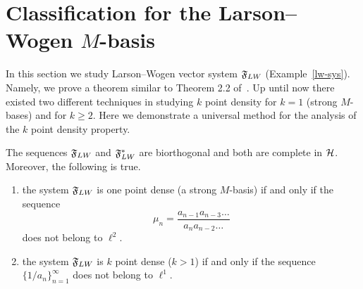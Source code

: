 \section{Classification for the Larson--Wogen $M$-basis}
  \label{section:lw-sys}
  In this section we study Larson--Wogen vector system $\fsys_{LW}$ (Example~\ref{lw-sys}).
  Namely, we prove a theorem similar to Theorem 2.2 of~\cite{katavolos}.
  Up until now there existed two different techniques in studying $k$ point density for $k=1$ (strong $M$-bases) and for $k\geq2$.
  Here we demonstrate a universal method for the analysis of the $k$ point density property.
  \begin{theorem}
    \label{thm:katavolos}
    The sequences $\fsys_{LW}$ and $\fsys_{LW}^*$ are biorthogonal and both are complete in $\cal{H}$.
    Moreover, the following is true.
    \begin{enumerate}
      \item  the system $\fsys_{LW}$ is one point dense (a strong $M$-basis) if and only if the sequence
        \begin{equation}
          \mu_n = \frac{a_{n-1} a_{n-3} \dots}{a_{n} a_{n-2} \dots }
        \end{equation}
        does not belong to $\ell^2$.
      \item the system $\fsys_{LW}$ is $k$ point dense ($k > 1$) if and only if the sequence $\{1/a_n\}_{n=1}^\infty$ does not belong to $\ell^1$.
    \end{enumerate}
  \end{theorem}
